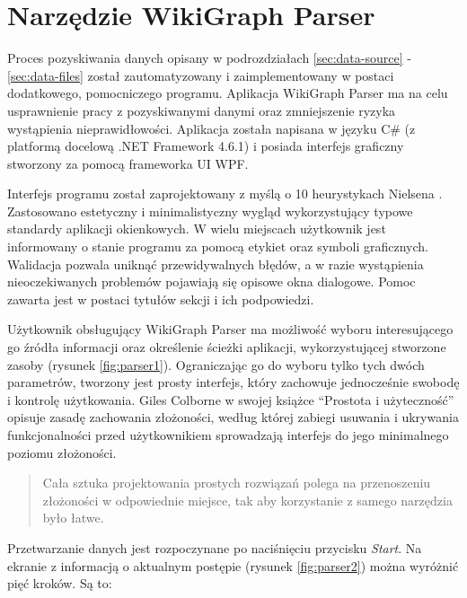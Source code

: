\section{Narzędzie WikiGraph Parser}
\label{sec:parser-tool}
Proces pozyskiwania danych opisany w podrozdziałach \ref{sec:data-source} - \ref{sec:data-files} został zautomatyzowany i zaimplementowany w postaci dodatkowego, pomocniczego programu. Aplikacja WikiGraph Parser ma na celu usprawnienie pracy z pozyskiwanymi danymi oraz zmniejszenie ryzyka wystąpienia nieprawidłowości. Aplikacja została napisana w języku C\# (z platformą docelową .NET Framework 4.6.1) i posiada interfejs graficzny stworzony za pomocą frameworka UI WPF.

Interfejs programu został zaprojektowany z myślą o 10 heurystykach Nielsena \cite{Heuristics}. Zastosowano estetyczny i minimalistyczny wygląd wykorzystujący typowe standardy aplikacji okienkowych. W wielu miejscach użytkownik jest informowany o stanie programu za pomocą etykiet oraz symboli graficznych. Walidacja pozwala uniknąć przewidywalnych błędów, a w razie wystąpienia nieoczekiwanych problemów pojawiają się opisowe okna dialogowe. Pomoc zawarta jest w postaci tytułów sekcji i ich podpowiedzi.


Użytkownik obsługujący WikiGraph Parser ma możliwość wyboru interesującego go źródła informacji oraz określenie ścieżki aplikacji, wykorzystującej stworzone zasoby (rysunek \ref{fig:parser1}). Ograniczając go do wyboru tylko tych dwóch parametrów, tworzony jest prosty interfejs, który zachowuje jednocześnie swobodę i kontrolę użytkowania. Giles Colborne w swojej książce ``Prostota i użyteczność'' \cite{ProstotaUzytecznosc} opisuje zasadę zachowania złożoności, według której zabiegi usuwania i ukrywania funkcjonalności przed użytkownikiem sprowadzają interfejs do jego minimalnego poziomu złożoności.

\begin{center}
	\hyphenblockcquote{polish}{ProstotaUzytecznosc}{
        Cała sztuka projektowania prostych rozwiązań polega na przenoszeniu złożoności w odpowiednie miejsce, tak aby korzystanie z samego narzędzia było łatwe.
	}
\end{center}


Przetwarzanie danych jest rozpoczynane po naciśnięciu przycisku \textit{Start}. Na ekranie z informacją o aktualnym postępie (rysunek \ref{fig:parser2}) można wyróżnić pięć kroków. Są to:

